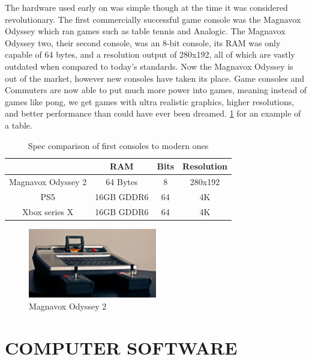 \documentclass[letterpaper, 10 pt, conference]{IEEEconf}
\begin{document}
The hardware used early on was simple though at the time it was considered revolutionary. The first commercially successful game console was the Magnavox Odyssey which ran games such as table tennis and Analogic. The Magnavox Odyssey two, their second console, was an 8-bit console, its RAM was only capable of 64 bytes, and a resolution output of 280x192, all of which are vastly outdated when compared to today's standards. Now the Magnavox Odyssey is out of the market, however new consoles have taken its place. Game consoles and Commuters are now able to put much more power into games, meaning instead of games like pong, we get games with ultra realistic graphics, higher resolutions, and better performance than could have ever been dreamed.
\ref{tbl:example} for an example of a table.



\begin{table}[h!]
\begin{center}
\begin{tabular}{||c | c | c | c||} 
\hline
  & RAM & Bits & Resolution \\ [0.5ex]
\hline\hline
Magnavox Odyssey 2 & 64 Bytes & 8 & 280x192 \\ 
\hline
PS5 & 16GB GDDR6 & 64 & 4K \\
\hline
Xbox series X & 16GB GDDR6 & 64 & 4K \\
\hline
\end{tabular}
\caption{Spec comparison of first consoles to modern ones }
\label{tbl:example}
\end{center}
\end{table}

\begin{figure}[h!]
\centering
\includegraphics[width=0.5\textwidth]{images/odyssey2-front.jpg}
\caption{Magnavox Odyssey 2}
\label{fig:example}
\end{figure} 

\section{COMPUTER SOFTWARE}
\end{document}
